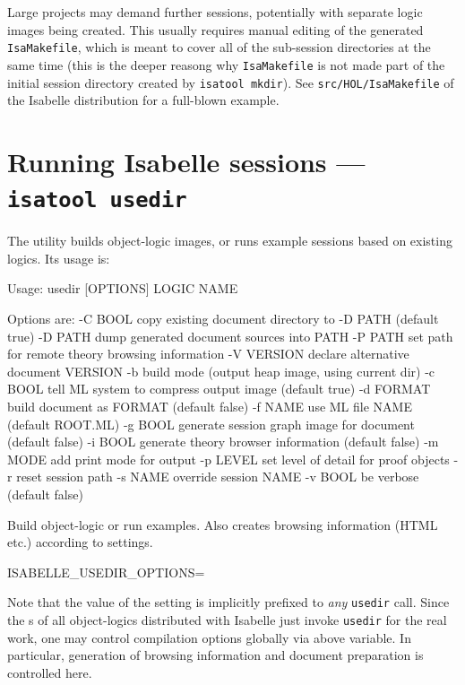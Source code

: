 \medskip Large projects may demand further sessions, potentially with separate
logic images being created.  This usually requires manual editing of the
generated \texttt{IsaMakefile}, which is meant to cover all of the sub-session
directories at the same time (this is the deeper reasong why
\texttt{IsaMakefile} is not made part of the initial session directory created
by \texttt{isatool mkdir}).  See \texttt{src/HOL/IsaMakefile} of the Isabelle
distribution for a full-blown example.


\section{Running Isabelle sessions --- \texttt{isatool usedir}} \label{sec:tool-usedir}

The  utility builds object-logic images, or runs example
sessions based on existing logics. Its usage is:
\begin{ttbox}

Usage: usedir [OPTIONS] LOGIC NAME

  Options are:
    -C BOOL      copy existing document directory to -D PATH (default true)
    -D PATH      dump generated document sources into PATH
    -P PATH      set path for remote theory browsing information
    -V VERSION   declare alternative document VERSION
    -b           build mode (output heap image, using current dir)
    -c BOOL      tell ML system to compress output image (default true)
    -d FORMAT    build document as FORMAT (default false)
    -f NAME      use ML file NAME (default ROOT.ML)
    -g BOOL      generate session graph image for document (default false)
    -i BOOL      generate theory browser information (default false)
    -m MODE      add print mode for output
    -p LEVEL     set level of detail for proof objects
    -r           reset session path
    -s NAME      override session NAME
    -v BOOL      be verbose (default false)

  Build object-logic or run examples. Also creates browsing
  information (HTML etc.) according to settings.

  ISABELLE_USEDIR_OPTIONS=
\end{ttbox}

Note that the value of the  setting is
implicitly prefixed to \emph{any} \texttt{usedir} call. Since the
s of all object-logics distributed with Isabelle just
invoke \texttt{usedir} for the real work, one may control compilation options
globally via above variable. In particular, generation of 
browsing information and document preparation is controlled here.


